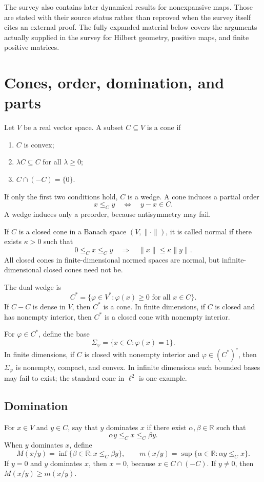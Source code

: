\documentclass[11pt]{article}
\newcommand{\R}{\mathbb{R}}
\begin{document}
The survey also contains later dynamical results for nonexpansive maps.  Those are stated with their source status rather than reproved when the survey itself cites an external proof.  The fully expanded material below covers the arguments actually supplied in the survey for Hilbert geometry, positive maps, and finite positive matrices.

\section{Cones, order, domination, and parts}
Let \(V\) be a real vector space.  A subset \(C\subseteq V\) is a cone if
\begin{enumerate}[label=(C\arabic*),leftmargin=2em]
\item \(C\) is convex;
\item \(\lambda C\subseteq C\) for all \(\lambda\ge0\);
\item \(C\cap(-C)=\{0\}\).
\end{enumerate}
If only the first two conditions hold, \(C\) is a wedge.  A cone induces a partial order
\[
  x\le_C y\quad\Longleftrightarrow\quad y-x\in C.
\]
A wedge induces only a preorder, because antisymmetry may fail.

If \(C\) is a closed cone in a Banach space \((V,\|\cdot\|)\), it is called normal if there exists \(\kappa>0\) such that
\[
  0\le_C x\le_C y\quad\Longrightarrow\quad \|x\|\le\kappa\|y\|.
\]
All closed cones in finite-dimensional normed spaces are normal, but infinite-dimensional closed cones need not be.

The dual wedge is
\[
  C^*=\{\varphi\in V^*: \varphi(x)\ge0\text{ for all }x\in C\}.
\]
If \(C-C\) is dense in \(V\), then \(C^*\) is a cone.  In finite dimensions, if \(C\) is closed and has nonempty interior, then \(C^*\) is a closed cone with nonempty interior.

For \(\varphi\in C^*\), define the base
\[
  \Sigma_\varphi=\{x\in C:\varphi(x)=1\}.
\]
In finite dimensions, if \(C\) is closed with nonempty interior and \(\varphi\in (C^*)^\circ\), then \(\Sigma_\varphi\) is nonempty, compact, and convex.  In infinite dimensions such bounded bases may fail to exist; the standard cone in \(\ell^2\) is one example.

\subsection{Domination}
For \(x\in V\) and \(y\in C\), say that \(y\) dominates \(x\) if there exist \(\alpha,\beta\in\R\) such that
\[
  \alpha y\le_C x\le_C \beta y.
\]
When \(y\) dominates \(x\), define
\[
  M(x/y)=\inf\{\beta\in\R:x\le_C \beta y\},
  \qquad
  m(x/y)=\sup\{\alpha\in\R:\alpha y\le_C x\}.
\]
If \(y=0\) and \(y\) dominates \(x\), then \(x=0\), because \(x\in C\cap(-C)\).  If \(y\ne0\), then \(M(x/y)\ge m(x/y)\).
\end{document}
